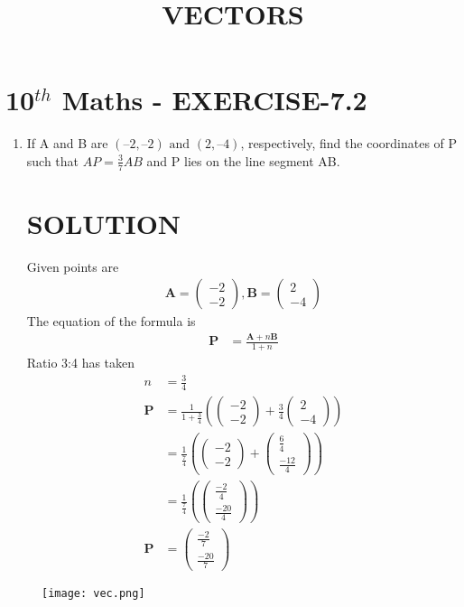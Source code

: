 \documentclass[journal,10pt,twocolumn]{article}
\providecommand{\brak}[1]{\ensuremath{\left(#1\right)}}
\newcommand{\myvec}[1]{\ensuremath{\begin{pmatrix}#1\end{pmatrix}}}
\let\vec\mathbf
\begin{document}
\begin{center}
\title{\textbf{VECTORS}}
\date{\vspace{-5ex}} %
\maketitle
\end{center}

\section{10$^{th}$ Maths - EXERCISE-7.2}

\begin{enumerate}
\item If A and B are $(– 2, – 2)\text{ and }(2, – 4)$, respectively, find the coordinates of P such that $AP =\frac{3}{7}AB$ and P lies on the line segment AB. 

\section{SOLUTION}
Given points are
\begin{align}
\vec{A}=\myvec{-2\\ -2} ,
\vec{B}=\myvec{2\\ -4}
\end{align}
The equation of the formula is
\begin{align}
\vec{P}&=\frac{\vec{A}+n\vec{B}}{1+n}
\end{align}
Ratio 3:4 has taken 
\begin{align}
n&=\frac{3}{4}\\
\vec{P}&=\frac{1}{1+\frac{3}{4}}\brak{\myvec{-2\\-2}+\frac{3}{4}\myvec{2\\-4}}\\
&=\frac{1}{\frac{7}{4}}\brak{\myvec{-2\\ -2}+\myvec{\frac{6}{4}\\[1pt] \frac{-12}{4}}}\\
&=\frac{1}{\frac{7}{4}}\brak {\myvec{\frac{-2}{4}\\[1pt] \frac{-20}{4}}}\\
\vec{P}&=\myvec{\frac{-2}{7}\\[1pt] \frac{-20}{7}}
\end{align}
\end{enumerate}
\begin{figure}
   \centering 
 \texttt{[image: vec.png]}
   \caption{}
   \label{fig:vec.png}
   \end{figure}
\end{document}
